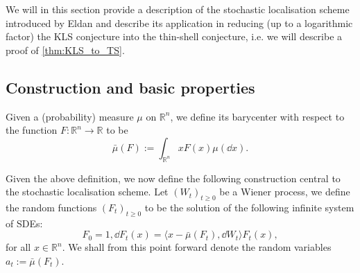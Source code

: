 We will in this section provide a description of the stochastic localisation scheme introduced by 
Eldan \cite{Eldan_2013} and describe its application in reducing (up to a logarithmic factor) the 
KLS conjecture into the thin-shell conjecture, i.e. we will describe a proof of \ref{thm:KLS_to_TS}.


\subsection{Construction and basic properties}

\begin{definition}[Barycenter]
  Given a (probability) measure \(\mu\) on \(\mathbb{R}^n\), we define 
  its barycenter with respect to the function \(F : \mathbb{R}^n \to \mathbb{R}\) to be
  \[\bar{\mu}(F) := \int_{\mathbb{R}^n} x F(x) \mu(\dd x).\]
\end{definition}

Given the above definition, we now define the following construction central to the stochastic 
localisation scheme. Let \((W_t)_{t \ge 0}\) be a Wiener process, we define the random functions 
\((F_t)_{t \ge 0}\) to be the solution of the following infinite system of SDEs: 
\begin{equation}\label{eq:stoch_loc}
  F_0 = 1, \dd F_t(x) = \langle x - \bar{\mu}(F_t), \dd W_t \rangle F_t(x),
\end{equation}
for all \(x \in \mathbb{R}^n\). We shall from this point forward denote the random variables 
\(a_t := \bar{\mu}(F_t)\).

